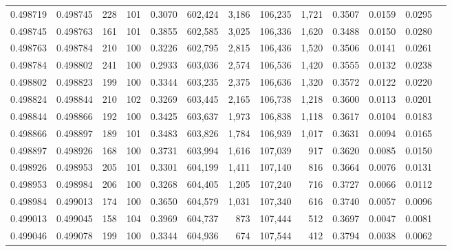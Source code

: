 \begin{tabular}{rrrrrrrrrrrrr}
0.498719 & 0.498745 &   228 & 101 &                                     0.3070 & 602,424 &   3,186 & 106,235 &   1,721 & 0.3507 & 0.0159 & 0.0295 \\
0.498745 & 0.498763 &   161 & 101 &                                     0.3855 & 602,585 &   3,025 & 106,336 &   1,620 & 0.3488 & 0.0150 & 0.0280 \\
0.498763 & 0.498784 &   210 & 100 &                                     0.3226 & 602,795 &   2,815 & 106,436 &   1,520 & 0.3506 & 0.0141 & 0.0261 \\
0.498784 & 0.498802 &   241 & 100 &                                     0.2933 & 603,036 &   2,574 & 106,536 &   1,420 & 0.3555 & 0.0132 & 0.0238 \\
0.498802 & 0.498823 &   199 & 100 &                                     0.3344 & 603,235 &   2,375 & 106,636 &   1,320 & 0.3572 & 0.0122 & 0.0220 \\
0.498824 & 0.498844 &   210 & 102 &                                     0.3269 & 603,445 &   2,165 & 106,738 &   1,218 & 0.3600 & 0.0113 & 0.0201 \\
0.498844 & 0.498866 &   192 & 100 &                                     0.3425 & 603,637 &   1,973 & 106,838 &   1,118 & 0.3617 & 0.0104 & 0.0183 \\
0.498866 & 0.498897 &   189 & 101 &                                     0.3483 & 603,826 &   1,784 & 106,939 &   1,017 & 0.3631 & 0.0094 & 0.0165 \\
0.498897 & 0.498926 &   168 & 100 &                                     0.3731 & 603,994 &   1,616 & 107,039 &     917 & 0.3620 & 0.0085 & 0.0150 \\
0.498926 & 0.498953 &   205 & 101 &                                     0.3301 & 604,199 &   1,411 & 107,140 &     816 & 0.3664 & 0.0076 & 0.0131 \\
0.498953 & 0.498984 &   206 & 100 &                                     0.3268 & 604,405 &   1,205 & 107,240 &     716 & 0.3727 & 0.0066 & 0.0112 \\
0.498984 & 0.499013 &   174 & 100 &                                     0.3650 & 604,579 &   1,031 & 107,340 &     616 & 0.3740 & 0.0057 & 0.0096 \\
0.499013 & 0.499045 &   158 & 104 &                                     0.3969 & 604,737 &     873 & 107,444 &     512 & 0.3697 & 0.0047 & 0.0081 \\
0.499046 & 0.499078 &   199 & 100 &                                     0.3344 & 604,936 &     674 & 107,544 &     412 & 0.3794 & 0.0038 & 0.0062 \\

\end{tabular}
